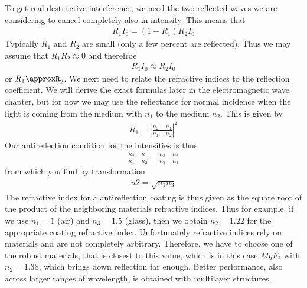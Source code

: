 \documentclass[letterpaper,10pt,english]{sphinxmanual}
\begin{document}
To get real destructive interference, we need the two reflected waves we are considering to cancel completely also in intensity. This means that
\begin{equation*}
\begin{split}R_1 I_0=(1-R_1)R_2 I_0\end{split}
\end{equation*}
Typically \(R_1\) and \(R_2\) are small (only a few percent are reflected). Thus we may assume that \(R_1 R_2\approx 0\) and therefroe
\begin{equation*}
\begin{split}R_1 I_0\approx R_2 I_0\end{split}
\end{equation*}
or \(R_1\approxR_2\). We next need to relate the refractive indices to the reflection coefficient. We will derive the exact formulas later in the electromagnetic wave chapter, but for now we may use the reflectance for normal incidence when the light is coming from the medium with \(n_1\) to the medium \(n_2\). This is given by
\begin{equation*}
\begin{split}R_1=\left |\frac{n_2-n_1}{n_1+n_2}\right|^2\end{split}
\end{equation*}
Our anti\sphinxhyphen{}reflection condition for the intensities is thus
\begin{equation*}
\begin{split}\frac{n_2-n_1}{n_1+n_2}=\frac{n_3-n_2}{n_2+n_3}\end{split}
\end{equation*}
from which you find by transformation
\begin{equation*}
\begin{split}n2=\sqrt{n_1 n_3}\end{split}
\end{equation*}
The refractive index for a anti\sphinxhyphen{}reflection coating is thus given as the square root of the product of the neighboring materials refractive indices. Thus for example, if we use \(n_1=1\) (air) and \(n_3=1.5\) (glass), then we obtain \(n_2=1.22\) for the appropriate coating refractive index. Unfortunately refractive indices rely on materials and are not completely arbitrary. Therefore, we have to choose one of the robust materials, that is closest to this value, which is in this case
\(Mg F_2\) with \(n_2=1.38\), which brings down reflection far enough. Better performance, also across larger ranges of wavelength, is obtained with multilayer structures.
\end{document}
